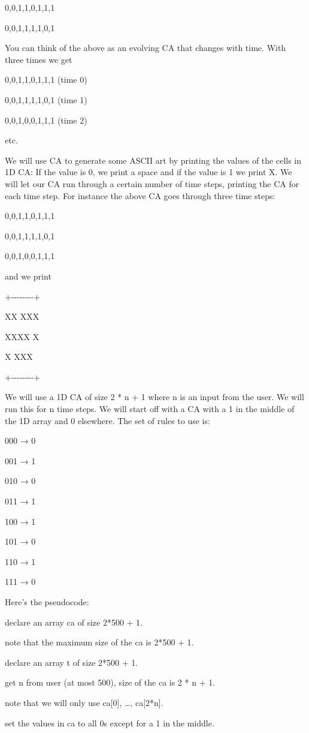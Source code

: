 \documentclass[
]{article}
\begin{document}
0,0,1,1,0,1,1,1

0,0,1,1,1,1,0,1

You can think of the above as an evolving CA that changes with time.
With three times we get

0,0,1,1,0,1,1,1 (time 0)

0,0,1,1,1,1,0,1 (time 1)

0,0,1,0,0,1,1,1 (time 2)

etc.

We will use CA to generate some ASCII art by printing the values of the
cells in 1D CA: If the value is 0, we print a space and if the value is
1 we print X. We will let our CA run through a certain number of time
steps, printing the CA for each time step. For instance the above CA
goes through three time steps:

0,0,1,1,0,1,1,1

0,0,1,1,1,1,0,1

0,0,1,0,0,1,1,1

and we print

+-\/-\/-\/-\/-\/-\/-\/-+

\textbar{} XX XXX\textbar{}

\textbar{} XXXX X\textbar{}

\textbar{} X XXX \textbar{}

+-\/-\/-\/-\/-\/-\/-\/-+

We will use a 1D CA of size 2 * n + 1 where n is an input from the user.
We will run this for n time steps. We will start off with a CA with a 1
in the middle of the 1D array and 0 elsewhere. The set of rules to use
is:

000 → 0

001 → 1

010 → 0

011 → 1

100 → 1

101 → 0

110 → 1

111 → 0

Here's the pseudocode:

declare an array ca of size 2*500 + 1.

note that the maximum size of the ca is 2*500 + 1.

declare an array t of size 2*500 + 1.

get n from user (at most 500), size of the ca is 2 * n + 1.

note that we will only use ca{[}0{]}, \ldots, ca{[}2*n{]}.

set the values in ca to all 0s except for a 1 in the middle.
\end{document}
